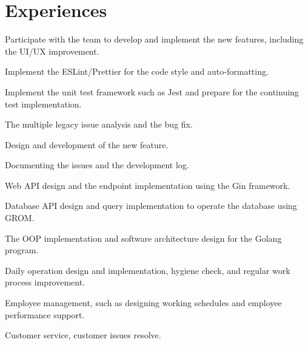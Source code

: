 \section{Experiences}

\begin{resume_list}
\item Participate with the team to develop and implement the new features, including the UI/UX improvement.
\item Implement the ESLint/Prettier for the code style and auto-formatting.
\item Implement the unit test framework such as Jest and prepare for the continuing test implementation.
\item The multiple legacy issue analysis and the bug fix.
\item  Design and development of the new feature.
\item  Documenting the issues and the development log.
\item Web API design and the endpoint implementation using the Gin framework.
\item Database API design and query implementation to operate the database using GROM. 
\item The OOP implementation and software architecture design for the Golang program.
\end{resume_list}

\vspace{1em}
\begin{resume_list}
\item Daily operation design and implementation, hygiene check, and regular work process improvement.
\item Employee management, such as designing working schedules and employee performance support.
\item Customer service, customer issues resolve.
\end{resume_list}

